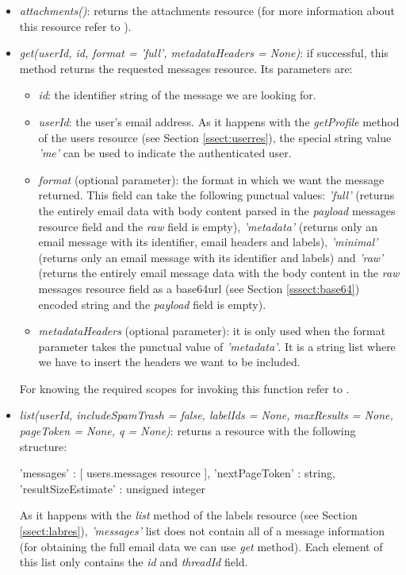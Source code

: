 \begin{itemize}
	\item\textit{attachments()}: returns the attachments resource (for more information about this resource refer to \cite[/v1/reference/users/messages/attachments]{gmailAPI}).
	\item\textit{get(userId, id, format = 'full', metadataHeaders = None)}: if successful, this method returns the requested messages resource. Its parameters are:
	\begin{itemize}
		\item\textit{id}: the identifier string of the message we are looking for.
		\item\textit{userId}: the user's email address. As it happens with the \textit{getProfile} method of the users resource (see Section \ref{ssect:userres}), the special string value \textit{'me'} can be used to indicate the authenticated user.
		\item\textit{format} (optional parameter): the format in which we want the message returned. This field can take the following punctual values: \textit{'full'} (returns the entirely email data with body content parsed in the \textit{payload} messages resource field and the \textit{raw} field is empty), \textit{'metadata'} (returns only an email message with its identifier, email headers and labels), \textit{'minimal'} (returns only an email message with its identifier and labels) and \textit{'raw'} (returns the entirely email message data with the body content in the \textit{raw} messages resource field as a base64url (see Section \ref{sssect:base64}) encoded string and the \textit{payload} field is empty).
		\item\textit{metadataHeaders} (optional parameter): it is only used when the format parameter takes the punctual value of \textit{'metadata'}. It is a string list where we have to insert the headers we want to be included.
	\end{itemize}
	For knowing the required scopes for invoking this function refer to \cite[/v1/reference/users/messages/get]{gmailAPI}.
	\item\textit{list(userId, includeSpamTrash = false, labelIds = None, maxResults = None, pageToken = None, q = None)}: returns a resource with the following structure:
	\begin{python}
		{
			'messages' : [ users.messages resource ],
			'nextPageToken' : string,
			'resultSizeEstimate' : unsigned integer
		}
	\end{python}
	As it happens with the \textit{list} method of the labels resource (see Section \ref{ssect:labres}), \textit{'messages'} list does not contain all of a message information (for obtaining the full email data we can use \textit{get} method). Each element of this list only contains the \textit{id} and \textit{threadId} field.
	

\end{itemize}

